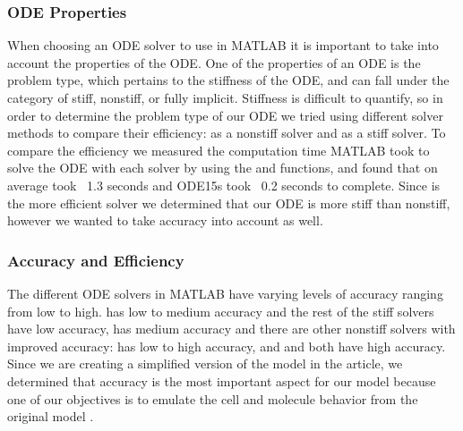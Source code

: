 \documentclass{article}
\begin{document}
\subsubsection{ODE Properties}
When choosing an ODE solver to use in MATLAB it is important to take into account the properties of the ODE. One of the properties of an ODE is the problem type, which pertains to the stiffness of the ODE, and can fall under the category of stiff, nonstiff, or fully implicit. Stiffness is difficult to quantify, so in order to determine the problem type of our ODE we tried using different solver methods to compare their efficiency:  as a nonstiff solver and  as a stiff solver. To compare the efficiency we measured the computation time MATLAB took to solve the ODE with each solver by using the  and  functions, and found that on average  took ~1.3 seconds and ODE15s took ~0.2 seconds to complete. Since  is the more efficient solver we determined that our ODE is more stiff than nonstiff, however we wanted to take accuracy into account as well.

\subsubsection{Accuracy and Efficiency}
The different ODE solvers in MATLAB have varying levels of accuracy ranging from low to high.  has low to medium accuracy and the rest of the stiff solvers have low accuracy,  has medium accuracy and there are other nonstiff solvers with improved accuracy:  has low to high accuracy, and  and  both have high accuracy. Since we are creating a simplified version of the model in the article, we determined that accuracy is the most important aspect for our model because one of our objectives is to emulate the cell and molecule behavior from the original model \cite{MAT}. 
\end{document}

